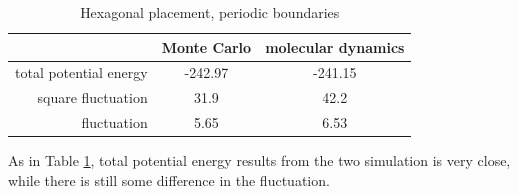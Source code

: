 \documentclass[UTF8,a4paper,no-math]{article}
\begin{document}
\begin{table}[H]
	\centering
	\caption{Hexagonal placement, periodic boundaries}
	\begin{tabular}{rcc}
		\toprule
		\toprule
		                       & Monte Carlo & molecular dynamics \\ \midrule
		total potential energy & -242.97     & -241.15            \\
		square fluctuation     & 31.9        & 42.2               \\
		fluctuation            & 5.65        & 6.53               \\
		\bottomrule
	\end{tabular}%
	\label{tab:hex1}%
\end{table}%
As in Table \ref{tab:hex1}, total potential energy results from the two simulation is very close, while there is still some difference
in the fluctuation.
\end{document}
